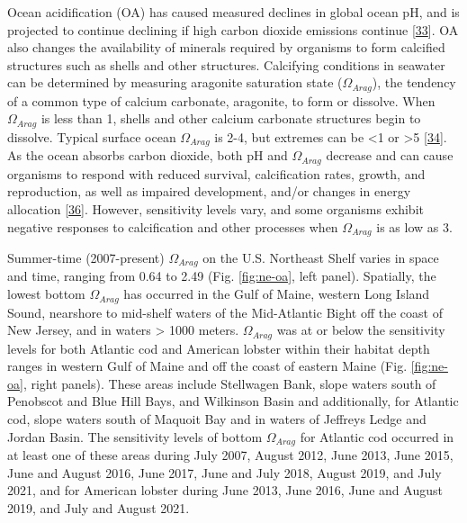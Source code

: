 \documentclass[
  10pt,
]{article}
\begin{document}
Ocean acidification (OA) has caused measured declines in global ocean pH, and is projected to continue declining if high carbon dioxide emissions continue {[}\protect\hyperlink{ref-intergovernmental_panel_on_climate_change_ipcc_technical_2022}{33}{]}. OA also changes the availability of minerals required by organisms to form calcified structures such as shells and other structures. Calcifying conditions in seawater can be determined by measuring aragonite saturation state (\(\Omega_{Arag}\)), the tendency of a common type of calcium carbonate, aragonite, to form or dissolve. When \(\Omega_{Arag}\) is less than 1, shells and other calcium carbonate structures begin to dissolve. Typical surface ocean \(\Omega_{Arag}\) is 2-4, but extremes can be \textless1 or \textgreater5 {[}\protect\hyperlink{ref-jiang_climatological_2015}{34}{]}. As the ocean absorbs carbon dioxide, both pH and \(\Omega_{Arag}\) decrease and can cause organisms to respond with reduced survival, calcification rates, growth, and reproduction, as well as impaired development, and/or changes in energy allocation {[}\protect\hyperlink{ref-saba_recommended_2019}{36}{]}. However, sensitivity levels vary, and some organisms exhibit negative responses to calcification and other processes when \(\Omega_{Arag}\) is as low as 3.

Summer-time (2007-present) \(\Omega_{Arag}\) on the U.S. Northeast Shelf varies in space and time, ranging from 0.64 to 2.49 (Fig. \ref{fig:ne-oa}, left panel). Spatially, the lowest bottom \(\Omega_{Arag}\) has occurred in the Gulf of Maine, western Long Island Sound, nearshore to mid-shelf waters of the Mid-Atlantic Bight off the coast of New Jersey, and in waters \textgreater{} 1000 meters. \(\Omega_{Arag}\) was at or below the sensitivity levels for both Atlantic cod and American lobster within their habitat depth ranges in western Gulf of Maine and off the coast of eastern Maine (Fig. \ref{fig:ne-oa}, right panels). These areas include Stellwagen Bank, slope waters south of Penobscot and Blue Hill Bays, and Wilkinson Basin and additionally, for Atlantic cod, slope waters south of Maquoit Bay and in waters of Jeffreys Ledge and Jordan Basin. The sensitivity levels of bottom \(\Omega_{Arag}\) for Atlantic cod occurred in at least one of these areas during July 2007, August 2012, June 2013, June 2015, June and August 2016, June 2017, June and July 2018, August 2019, and July 2021, and for American lobster during June 2013, June 2016, June and August 2019, and July and August 2021.
\end{document}
